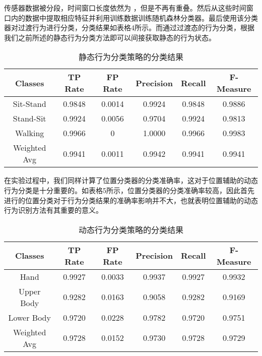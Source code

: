 
\par 传感器数据被分段，时间窗口长度依然为 ，但是不再有重叠。然后从这些时间窗口内的数据中提取相应特征并利用训练数据训练随机森林分类器。最后使用该分类器对过渡行为进行分类，分类结果如表格4所示。而通过过渡态的行为分类，根据我们之前所述的静态行为分类方法即可以间接获取静态的行为状态。

\begin{table}[!ht]
    \centering
    \caption{静态行为分类策略的分类结果}
    \begin{tabular}{cccccc}
    \toprule
    Classes & TP Rate & FP Rate & Precision & Recall & F-Measure \\
    \midrule
    Sit-Stand & 0.9848 & 0.0014 & 0.9924 & 0.9848 & 0.9886\\
    Stand-Sit & 0.9924 & 0.0056 & 0.9704 & 0.9924 & 0.9813\\
    Walking & 0.9966 & 0 & 1.0000 & 0.9966 & 0.9983\\
    \hline
    Weighted Avg & 0.9941 & 0.0011 & 0.9942 & 0.9941 & 0.9941\\
    \bottomrule
    \end{tabular}
 \end{table}

\par 在实验过程中，我们同样计算了位置分类器的分类准确率，这对于位置辅助的动态行为分类是十分重要的。如表格5所示，位置分类器的分类准确率较高，因此首先进行的位置分类对于行为分类结果的准确率影响并不大，也就表明位置辅助的动态行为识别方法有其重要的意义。

 \begin{table}[!htb]
    \centering
    \caption{动态行为分类策略的分类结果}
    \begin{tabular}{cccccc}
    \toprule
    Classes & TP Rate & FP Rate & Precision & Recall & F-Measure \\
    \midrule
    Hand & 0.9927 & 0.0033 & 0.9937 & 0.9927 & 0.9932\\
    Upper Body & 0.9282 & 0.0163 & 0.9058 & 0.9282 & 0.9169	\\
    Lower Body & 0.9720 & 0.0228 & 0.9782 & 0.9720 & 0.9751	\\
    \hline
    Weighted Avg & 0.9728 & 0.0152 & 0.9730 & 0.9728 & 0.9729\\
    \bottomrule
    \end{tabular}
 \end{table}


